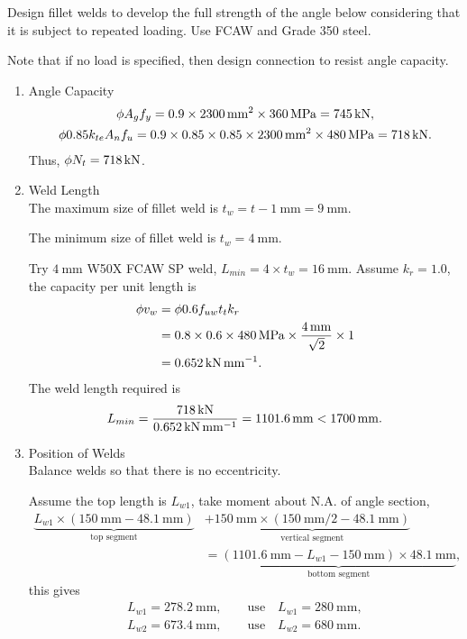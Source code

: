 \begin{exmp}
Design fillet welds to develop the full strength of the angle below considering that it is subject to repeated loading. Use FCAW and Grade 350 steel.

Note that if no load is specified, then design connection to resist angle capacity.
\begin{figure}[H]

\end{figure}
\end{exmp}
\begin{solution}
\begin{enumerate}
\item Angle Capacity
\begin{gather*}
\phi{}A_gf_y=0.9\times\SI{2300}{\milli\meter^2}\times\SI{360}{\mega\pascal}=\SI{745}{\kilo\newton},\\
\phi0.85k_{te}A_nf_u=0.9\times0.85\times0.85\times\SI{2300}{\milli\meter^2}\times\SI{480}{\mega\pascal}=\SI{718}{\kilo\newton}.
\end{gather*}
Thus, $\phi{}N_t=\SI{718}{\kilo\newton}$.
\item Weld Length\\
The maximum size of fillet weld is $t_w=t-\SI{1}{\mm}=\SI{9}{\mm}$.

The minimum size of fillet weld is $t_w=\SI{4}{\mm}$.

Try $\SI{4}{\mm}$ W50X FCAW SP weld, $L_{min}=4\times{}t_w=\SI{16}{\mm}$. Assume $k_r=1.0$, the capacity per unit length is
\begin{align*}
\phi{}v_w&=\phi{}0.6f_{uw}t_tk_r\\
&=0.8\times0.6\times\SI{480}{\mega\pascal}\times\dfrac{\SI{4}{\milli\meter}}{\sqrt{2}}\times1\\
&=\SI{0.652}{\kilo\newton\per\milli\meter}.
\end{align*}
The weld length required is
\begin{gather*}
L_{min}=\dfrac{\SI{718}{\kilo\newton}}{\SI{0.652}{\kilo\newton\per\milli\meter}}=\SI{1101.6}{\milli\meter}<\SI{1700}{\milli\meter}.
\end{gather*}
\item Position of Welds\\
Balance welds so that there is no eccentricity.
\begin{figure}[H]
\centering

\end{figure}
Assume the top length is $L_{w1}$, take moment about N.A. of angle section,
\begin{align*}
\underbrace{L_{w1}\times\left(\SI{150}{\mm}-\SI{48.1}{\mm}\right)}_\text{top segment}&+\underbrace{\SI{150}{\mm}\times\left(\SI{150}{\mm}/2-\SI{48.1}{\mm}\right)}_\text{vertical segment}\\&=\underbrace{\left(\SI{1101.6}{\mm}-L_{w1}-\SI{150}{\mm}\right)\times\SI{48.1}{\mm}}_\text{bottom segment},
\end{align*}
this gives
\begin{gather*}
L_{w1}=\SI{278.2}{\mm},\qquad\text{use}\quad{}L_{w1}=\SI{280}{\mm},\\
L_{w2}=\SI{673.4}{\mm},\qquad\text{use}\quad{}L_{w2}=\SI{680}{\mm}.
\end{gather*}


\end{enumerate}
\end{solution}

